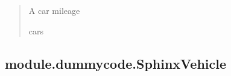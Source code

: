 \documentclass[letterpaper,10pt,english]{sphinxmanual}
\begin{document}
\begin{fulllineitems}
\begin{fulllineitems}
\begin{quote}
\begin{description}
\sphinxAtStartPar
A car mileage

\sphinxAtStartPar
cars

\end{description}\end{quote}

\end{fulllineitems}


\end{fulllineitems}


\sphinxstepscope


\subsection{module.dummycode.SphinxVehicle}
\label{\detokenize{_autosummary/module.dummycode.SphinxVehicle:module-dummycode-sphinxvehicle}}\label{\detokenize{_autosummary/module.dummycode.SphinxVehicle::doc}}
\end{document}
